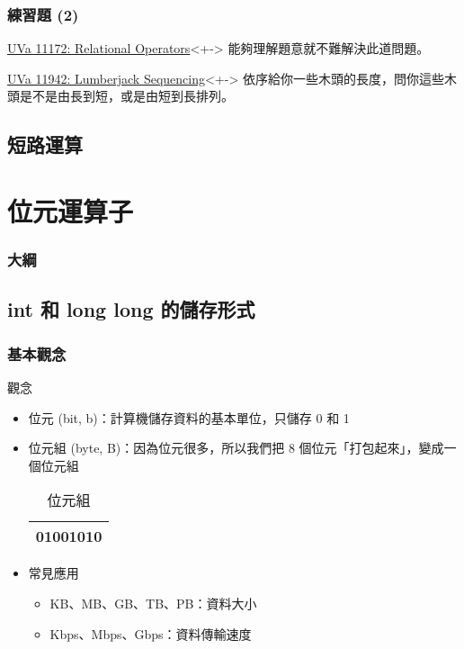 \documentclass[utf8]{beamer}
\begin{document}
\begin{CJK}{UTF8}{bkai}
\begin{frame}
  \frametitle{練習題 (2)}
  \begin{exampleblock}{\href{http://unfortunate-dog.github.io/articles/111/p11172/}{UVa 11172: Relational Operators}}<+->
  \label{uva:11172}
  能夠理解題意就不難解決此道問題。
  \end{exampleblock}
  \begin{exampleblock}{\href{http://unfortunate-dog.github.io/articles/119/p11942/}{UVa 11942: Lumberjack Sequencing}}<+->
  \label{uva:11942}
  依序給你一些木頭的長度，問你這些木頭是不是由長到短，或是由短到長排列。
  \end{exampleblock}
\end{frame}

\subsection{短路運算}

\section{位元運算子}
\begin{frame}
  \frametitle{大綱}
  \begin{multicols}{2}
    \tableofcontents[currentsection]
  \end{multicols}
\end{frame}

\subsection{int 和 long long 的儲存形式}

\begin{frame}[fragile]
  \frametitle{基本觀念}
  \begin{exampleblock}{觀念}
    \begin{itemize}[<+->]
    \item \alert{位元} (bit, b)：計算機儲存資料的基本單位，只儲存 \alert{0 和 1}
    \item \alert{位元組} (byte, B)：因為位元很多，所以我們把 8 個位元「打包起來」，變成一個位元組
      \begin{table}[h]
        \begin{tabular}{|c|}
        \hline
        01001010\\
        \hline
        \end{tabular}
        \caption{位元組}
      \end{table}
    \item 常見應用
      \begin{itemize}[<+->]
      \item KB、MB、GB、TB、PB：資料大小
      \item Kbps、Mbps、Gbps：資料傳輸速度
      \end{itemize}
    \end{itemize}
  \end{exampleblock}
\end{frame}


\end{CJK}
\end{document}

